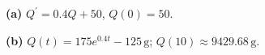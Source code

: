 \noindent\textbf{(a)} $Q^{\prime}=0.4Q+50$, $Q(0)=50$.

\noindent\textbf{(b)} $Q(t)=175e^{0.4t}-125\,\mathrm g$; $Q(10)\approx9429.68\,\mathrm g$.

